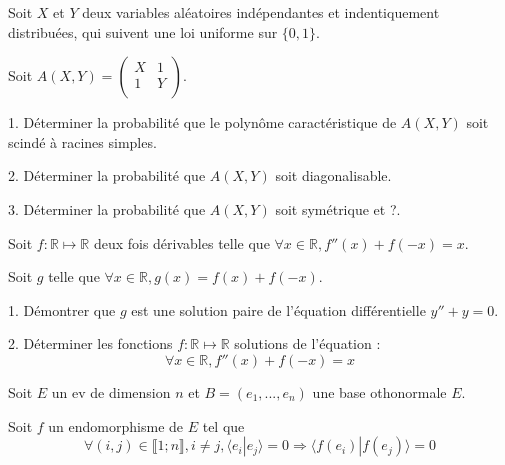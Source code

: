 \noindent Soit $X$ et $Y$ deux variables aléatoires indépendantes et indentiquement distribuées, qui suivent
une loi uniforme sur $\{0, 1\}$.

\noindent Soit $A(X, Y) = 
\begin{pmatrix}
X & 1 \\
1 & Y \\
\end{pmatrix}
$.

\vspace{5pt}
1. Déterminer la probabilité que le polynôme caractéristique de $A(X,Y)$ soit scindé à racines simples.

\vspace{5pt}
2. Déterminer la probabilité que $A(X, Y)$ soit diagonalisable.

\vspace{5pt}
3. Déterminer la probabilité que $A(X, Y)$ soit symétrique et ?.



\subetoiles
\columnbreak



\noindent Soit $f : \mathbb{R} \mapsto \mathbb{R}$ deux fois dérivables telle que
$\forall x \in \mathbb{R}, f''(x) + f(-x) = x$.

\vspace{5pt}
\noindent Soit $g$ telle que $\forall x \in \mathbb{R}, g(x) = f(x) + f(-x)$.

\vspace{5pt}
1. Démontrer que $g$ est une solution paire de l'équation différentielle $y'' + y = 0$.

\vspace{5pt}
2. Déterminer les fonctions $f : \mathbb{R} \mapsto \mathbb{R}$ solutions de l'équation :
\begin{equation*}
  \forall x \in \mathbb{R}, f''(x) + f(-x) = x
\end{equation*}



\subetoiles



\noindent Soit $E$ un ev de dimension $n$ et $B = (e_1, ..., e_n)$ une base othonormale $E$.

\noindent Soit $f$ un endomorphisme de $E$ tel que
\begin{equation*}
  \forall (i,j) \in \llbracket 1; n \rrbracket, i \ne j, \langle e_i | e_j \rangle = 0 \Rightarrow \langle f(e_i) | f(e_j) \rangle = 0
\end{equation*}

